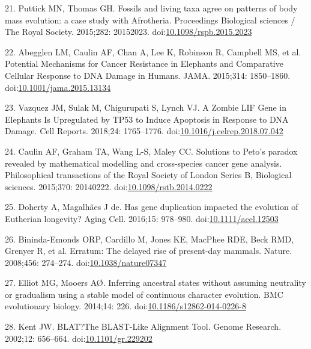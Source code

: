 \documentclass[]{elsarticle} %
\begin{document}
\leavevmode\hypertarget{ref-PuttickAndThomas2015}{}%
21. Puttick MN, Thomas GH. Fossils and living taxa agree on patterns of body mass evolution: a case study with Afrotheria. Proceedings Biological sciences / The Royal Society. 2015;282: 20152023. doi:\href{https://doi.org/10.1098/rspb.2015.2023}{10.1098/rspb.2015.2023}

\leavevmode\hypertarget{ref-Abegglen:JAMA2015}{}%
22. Abegglen LM, Caulin AF, Chan A, Lee K, Robinson R, Campbell MS, et al. Potential Mechanisms for Cancer Resistance in Elephants and Comparative Cellular Response to DNA Damage in Humans. JAMA. 2015;314: 1850--1860. doi:\href{https://doi.org/10.1001/jama.2015.13134}{10.1001/jama.2015.13134}

\leavevmode\hypertarget{ref-Vazquez2018}{}%
23. Vazquez JM, Sulak M, Chigurupati S, Lynch VJ. A Zombie LIF Gene in Elephants Is Upregulated by TP53 to Induce Apoptosis in Response to DNA Damage. Cell Reports. 2018;24: 1765--1776. doi:\href{https://doi.org/10.1016/j.celrep.2018.07.042}{10.1016/j.celrep.2018.07.042}

\leavevmode\hypertarget{ref-Caulin2015}{}%
24. Caulin AF, Graham TA, Wang L-S, Maley CC. Solutions to Peto's paradox revealed by mathematical modelling and cross-species cancer gene analysis. Philosophical transactions of the Royal Society of London Series B, Biological sciences. 2015;370: 20140222. doi:\href{https://doi.org/10.1098/rstb.2014.0222}{10.1098/rstb.2014.0222}

\leavevmode\hypertarget{ref-Doherty2016}{}%
25. Doherty A, Magalhães J de. Has gene duplication impacted the evolution of Eutherian longevity? Aging Cell. 2016;15: 978--980. doi:\href{https://doi.org/10.1111/acel.12503}{10.1111/acel.12503}

\leavevmode\hypertarget{ref-Bininda-Emonds2008}{}%
26. Bininda-Emonds ORP, Cardillo M, Jones KE, MacPhee RDE, Beck RMD, Grenyer R, et al. Erratum: The delayed rise of present-day mammals. Nature. 2008;456: 274--274. doi:\href{https://doi.org/10.1038/nature07347}{10.1038/nature07347}

\leavevmode\hypertarget{ref-ElliotAndMooers2014}{}%
27. Elliot MG, Mooers AØ. Inferring ancestral states without assuming neutrality or gradualism using a stable model of continuous character evolution. BMC evolutionary biology. 2014;14: 226. doi:\href{https://doi.org/10.1186/s12862-014-0226-8}{10.1186/s12862-014-0226-8}

\leavevmode\hypertarget{ref-blat}{}%
28. Kent JW. BLAT?The BLAST-Like Alignment Tool. Genome Research. 2002;12: 656--664. doi:\href{https://doi.org/10.1101/gr.229202}{10.1101/gr.229202}
\end{document}
